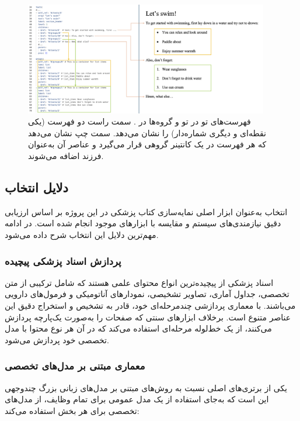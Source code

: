 \begin{figure}[!htbp]
    \centering
    \includegraphics[width=0.95\textwidth]{docling_doc_hierarchy_2.png}
    \caption{فهرست‌های تو در تو و گروه‌ها در . سمت راست دو فهرست (یکی نقطه‌ای و دیگری شماره‌دار) را نشان می‌دهد. سمت چپ نشان می‌دهد که هر فهرست در یک کانتینر گروهی قرار می‌گیرد و عناصر آن به‌عنوان فرزند اضافه می‌شوند.}
    \label{fig:docling_groups}
\end{figure}

\subsection{دلایل انتخاب }
انتخاب  به‌عنوان ابزار اصلی نمایه‌سازی کتاب پزشکی در این پروژه بر اساس ارزیابی دقیق نیازمندی‌های سیستم و مقایسه با ابزارهای موجود انجام شده است. در ادامه مهم‌ترین دلایل این انتخاب شرح داده می‌شود.

\subsubsection{پردازش اسناد پزشکی پیچیده}
اسناد پزشکی از پیچیده‌ترین انواع محتوای علمی هستند که شامل ترکیبی از متن تخصصی، جداول آماری، تصاویر تشخیصی، نمودارهای آناتومیکی و فرمول‌های دارویی می‌باشند.  با معماری پردازشی چندمرحله‌ای خود، قادر به تشخیص و استخراج دقیق این عناصر متنوع است. برخلاف ابزارهای سنتی که صفحات را به‌صورت یک‌پارچه پردازش می‌کنند،  از یک خط‌لوله مرحله‌ای استفاده می‌کند که در آن هر نوع محتوا با مدل تخصصی خود پردازش می‌شود.

\subsubsection{معماری مبتنی بر مدل‌های تخصصی}
یکی از برتری‌های اصلی  نسبت به روش‌های مبتنی بر مدل‌های زبانی بزرگ چندوجهی  این است که به‌جای استفاده از یک مدل عمومی برای تمام وظایف، از مدل‌های تخصصی برای هر بخش استفاده می‌کند:

